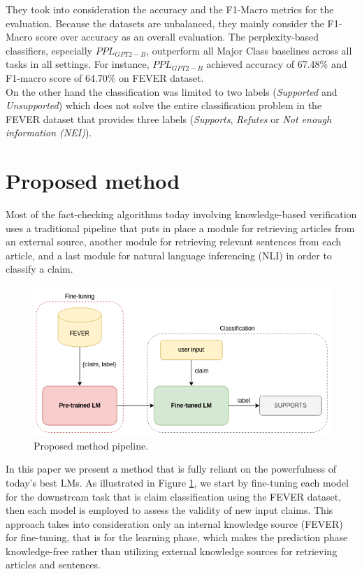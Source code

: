 \documentclass[conference]{IEEEtran}
\begin{document}
They took into consideration the accuracy and the F1-Macro metrics for the evaluation. Because the datasets are unbalanced, they mainly consider the F1-Macro score over accuracy as an overall evaluation. The perplexity-based classifiers, especially $PPL_{GPT2-B}$, outperform all Major Class baselines across all
tasks in all settings. For instance, $PPL_{GPT2-B}$ achieved accuracy of 67.48\% and F1-macro score of 64.70\% on FEVER dataset.\\
On the other hand the classification was limited to two labels (\emph{Supported} and \emph{Unsupported}) which does not solve the entire classification problem in the FEVER dataset that provides three labels (\textit{Supports}, \textit{Refutes} or \textit{Not enough information (NEI)}).

\section{Proposed method}
Most of the fact-checking algorithms today involving knowledge-based verification uses a traditional pipeline that puts in place a module for retrieving articles from an external source, another module for retrieving relevant sentences from each article, and a last module for natural language inferencing (NLI) in order to classify a claim.

\begin{figure}[htp]
    \centering
    \includegraphics[scale=0.4]{processing_pipeline.png}
    \caption{Proposed method pipeline.}
    \label{fig:processing_pipeline}
\end{figure}


In this paper we present a method that is fully  reliant on the powerfulness of today's best LMs. As illustrated in Figure \ref{fig:processing_pipeline}, we start by fine-tuning each model for the downstream task that is claim classification using the FEVER dataset, then each model is employed to assess the validity of new input claims. This approach takes into consideration only an internal knowledge source (FEVER) for fine-tuning, that is for the learning phase, which makes the prediction phase knowledge-free rather than utilizing external knowledge sources for retrieving articles and sentences.
\end{document}
